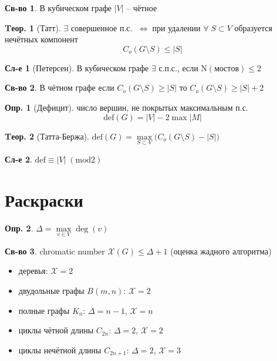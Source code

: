 \documentclass[a4paper,12pt]{article}
\theoremstyle{definition}
\newtheorem{definition}{Опр.}[section]
\newtheorem*{property}{Св-во}  %
\theoremstyle{definition}
\newtheorem{theorem}{Tеор.}[section]
\newtheorem*{corollary}{Сл-е} %
\def\iiff{$\;\Longleftrightarrow\;$}
\def\iiChi{\mathcal{X}}
\def\iiany{$\forall\;$}
\begin{document}
\begin{property}
	В кубическом графе $|V|$ -- чётное
\end{property}

\begin{theorem}[Татт]
	$\exists$ совершенное п.с. \iiff при удалении \iiany $S \subset V$ образуется нечётных компонент
	\[ C_{o}(G \setminus S) \leqslant |S| \]
\end{theorem}

\begin{corollary}[Петерсен]
	В кубическом графе $\exists$ с.п.с., если $\mathrm{N}(мостов) \leqslant 2$
\end{corollary}

\begin{property}
В чётном графе если $C_{o}(G \setminus S) \ge |S|$ то $C_{o}(G \setminus S) \geqslant |S|+2$
\end{property}

\begin{definition}[Дефицит]
	число вершин, не покрытых максимальным п.с.
	\[ \mathrm{def}(G)=|V|-2\max|M| \]
\end{definition}

\begin{theorem}[Татта-Бержа]
	$ \mathrm{def}(G) = \max\limits_{S \subset V} \big( C_{o}(G \setminus S) - \left|S\right| \big) $
\end{theorem}

\begin{corollary}
	$ \mathrm{def} \equiv |V| \; (\mathrm{mod} 2) $
\end{corollary}



\section{Раскраски}

\begin{definition} $\Delta = \max \limits_{v \in V} \deg(v)$ \end{definition}

\begin{property}
	chromatic number $\iiChi(G) \leqslant \Delta + 1$ (оценка жадного алгоритма)
\end{property}

\begin{itemize}
  \item  деревья:  $\iiChi=2$
  \item  двудольные графы $B(m,n)$: $\iiChi=2$
  \item  полные графы $K_n$:        $\Delta=n-1$, $\iiChi=n$
  \item  циклы чётной длины $C_{2n}$:     $\Delta=2$, $\iiChi=2$
  \item  циклы нечётной длины $C_{2n+1}$: $\Delta=2$, $\iiChi=3$
\end{itemize}
\end{document}
